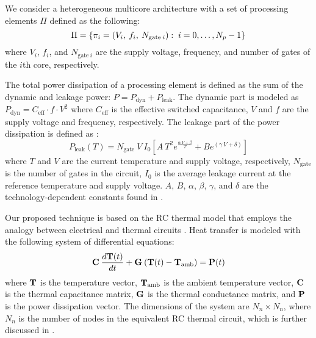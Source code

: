
\label{sec:architecture-model}
We consider a heterogeneous multicore architecture with a set of processing elements $\Pi$ defined as the following:
\[
  \Pi = \{ \pi_i = (V_i, \: f_i, \: N_{\text{gate} \: i}): \; i = 0, \dots, N_p - 1 \}
\]
where $V_i$, $f_i$, and $N_{\text{gate} \: i}$ are the supply voltage, frequency, and number of gates \cite{liao2005} of the $i$th core, respectively.

\label{sec:power-model}
The total power dissipation of a processing element is defined as the sum of the dynamic and leakage power: $P = P_\text{dyn} + P_\text{leak}$. The dynamic part is modeled as $P_\text{dyn} = C_\text{eff} \cdot f \cdot V^2$ where $C_\text{eff}$ is the effective switched capacitance, $V$ and $f$ are the supply voltage and frequency, respectively. The leakage part of the power dissipation is defined as \cite{liao2005}:
\begin{equation} \label{eq:total-power}
  P_\text{leak}(T) = N_\text{gate} \: V \: I_0 \left[ A \: T^2 e^{\frac{\alpha \: V + \beta}{T}} + B e^{(\gamma \: V + \delta)} \right]
\end{equation}
where $T$ and $V$ are the current temperature and supply voltage, respectively, $N_\text{gate}$ is the number of gates in the circuit, $I_0$ is the average leakage current at the reference temperature and supply voltage. $A$, $B$, $\alpha$, $\beta$, $\gamma$, and $\delta$ are the technology-dependent constants found in \cite{liao2005}.

\label{sec:thermal-model}
Our proposed technique is based on the RC thermal model that employs the analogy between electrical and thermal circuits \cite{kreith2000}. Heat transfer is modeled with the following system of differential equations:
\begin{equation} \label{eq:fourier-model}
  \mathbf{C} \: \frac{d\mathbf{T}(t)}{dt} + \mathbf{G} \: (\mathbf{T}(t) - \mathbf{T}_\text{amb})= \mathbf{P}(t)
\end{equation}
where $\mathbf{T}$ is the temperature vector, $\mathbf{T}_\text{amb}$ is the ambient temperature vector, $\mathbf{C}$ is the thermal capacitance matrix, $\mathbf{G}$ is the thermal conductance matrix, and $\mathbf{P}$ is the power dissipation vector. The dimensions of the system are \mbox{$N_n \times N_n$}, where $N_n$ is the number of nodes in the equivalent RC thermal circuit, which is further discussed in .

